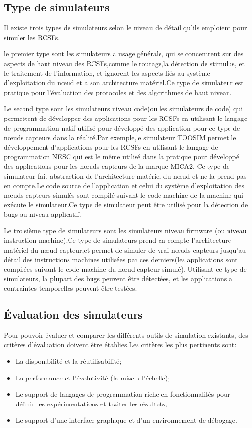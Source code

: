 \subsection{Type de simulateurs}
Il existe trois types de simulateurs selon le niveau de détail qu'ils emploient pour simuler les RCSFs.

le premier type sont les simulateurs a usage générale, qui se concentrent sur des aspects de haut niveau des RCSFs,comme le routage,la détection de stimulus, et le traitement de l'information, et ignorent les aspects liés au système d'exploitation du nœud et a  son architecture matériel.Ce type de simulateur est pratique pour l'évaluation des protocoles et des algorithmes de haut niveau.

Le second type sont les simulateurs niveau code(ou les simulateurs de code) qui permettent de développer des applications pour les RCSFs en utilisant le langage de programmation natif utilisé pour développé des application pour ce type de nœuds capteurs dans la réalité.Par exemple,le simulateur TOOSIM permet le développement d'applications pour les RCSFs en utilisant le langage de programmation NESC qui est le même utilisé dans la pratique pour développé des applications pour les nœuds capteurs de la marque MICA2.
Ce type de simulateur fait abstraction de l'architecture matériel du nœud et ne la prend pas en compte.Le code source de l'application et celui du système d'exploitation des nœuds capteurs simulés sont compilé suivant le code machine de la machine qui exécute le simulateur.Ce type de simulateur peut être utilisé pour la détection de bugs au niveau applicatif.

Le troisième type de simulateurs sont les simulateurs niveau firmware (ou niveau instruction machine).Ce type de simulateurs prend en compte l'architecture matériel du nœud capteur,et permet de simuler de vrai nœuds capteurs jusqu'au détail des instructions machines utilisées par ces derniers(les applications sont compilées suivant le code machine du nœud capteur simulé).
Utilisant ce type de simulateurs, la plupart des bugs peuvent être détectées, et les applications a contraintes temporelles peuvent être testées.

\subsection{Évaluation des simulateurs}
Pour pouvoir évaluer et comparer les différents outils de simulation existants, des critères d'évaluation doivent être établies.Les critères les plus pertinents sont:
\begin{itemize}
\item La disponibilité et la réutilisabilité;
\item La performance et l'évolutivité (la mise a l'échelle);
\item Le support de langages de programmation riche en fonctionnalités pour définir les expérimentations et traiter les résultats;
\item Le support d'une interface graphique et d'un environnement de débogage.
\end{itemize}

